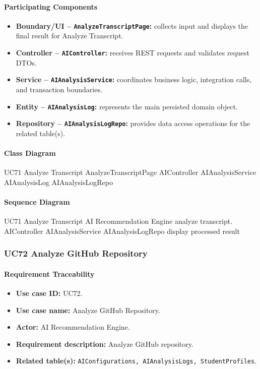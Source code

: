 \paragraph{Participating Components}

\begin{itemize}
    \item \textbf{Boundary/UI -- \texttt{AnalyzeTranscriptPage}:} collects input and displays the final result for Analyze Transcript.
    \item \textbf{Controller -- \texttt{AIController}:} receives REST requests and validates request DTOs.
    \item \textbf{Service -- \texttt{AIAnalysisService}:} coordinates business logic, integration calls, and transaction boundaries.
    \item \textbf{Entity -- \texttt{AIAnalysisLog}:} represents the main persisted domain object.
    \item \textbf{Repository -- \texttt{AIAnalysisLogRepo}:} provides data access operations for the related table(s).
\end{itemize}

\paragraph{Class Diagram}

\ClassDiagram
{UC71 Analyze Transcript}
{AnalyzeTranscriptPage}
{AIController}
{AIAnalysisService}
{AIAnalysisLog}
{AIAnalysisLogRepo}

\paragraph{Sequence Diagram}

\SequenceDiagram
{UC71 Analyze Transcript}
{AI Recommendation Engine}
{analyze transcript.}
{AIController}
{AIAnalysisService}
{AIAnalysisLogRepo}
{display processed result}

\subsubsection{UC72 Analyze GitHub Repository}

\paragraph{Requirement Traceability}

\begin{itemize}
    \item \textbf{Use case ID:} UC72.
    \item \textbf{Use case name:} Analyze GitHub Repository.
    \item \textbf{Actor:} AI Recommendation Engine.
    \item \textbf{Requirement description:} Analyze GitHub repository.
    \item \textbf{Related table(s):} \texttt{AIConfigurations, AIAnalysisLogs, StudentProfiles}.
\end{itemize}

